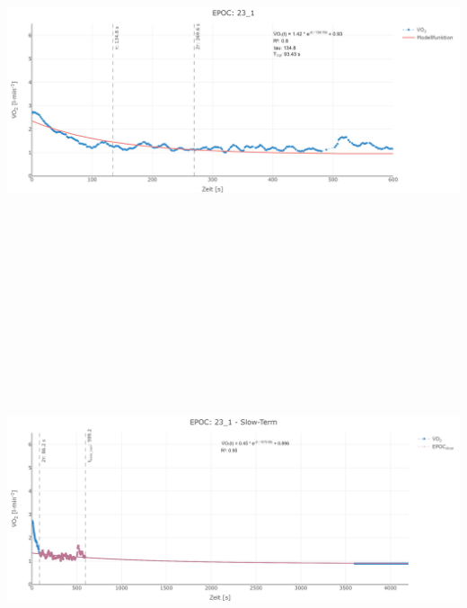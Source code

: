 \documentclass[
  letterpaper,
  DIV=11]{scrartcl}
\begin{document}
\includegraphics[width=11.45833in,height=4.6875in]{images/23_1_tau.png}
\includegraphics[width=11.45833in,height=4.6875in]{images/23_1_slow.png}
\end{document}
